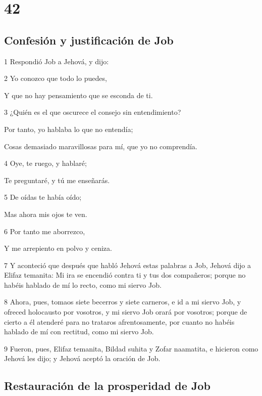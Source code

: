 \chapter{42}

\section*{Confesión y justificación de Job}

\par 1 Respondió Job a Jehová, y dijo:
\par 2 Yo conozco que todo lo puedes,
\par Y que no hay pensamiento que se esconda de ti.
\par 3 ¿Quién es el que oscurece el consejo sin entendimiento?
\par Por tanto, yo hablaba lo que no entendía;
\par Cosas demasiado maravillosas para mí, que yo no comprendía.
\par 4 Oye, te ruego, y hablaré;
\par Te preguntaré, y tú me enseñarás. 
\par 5 De oídas te había oído;
\par Mas ahora mis ojos te ven.
\par 6 Por tanto me aborrezco,
\par Y me arrepiento en polvo y ceniza.
\par 7 Y aconteció que después que habló Jehová estas palabras a Job, Jehová dijo a Elifaz temanita: Mi ira se encendió contra ti y tus dos compañeros; porque no habéis hablado de mí lo recto, como mi siervo Job.
\par 8 Ahora, pues, tomaos siete becerros y siete carneros, e id a mi siervo Job, y ofreced holocausto por vosotros, y mi siervo Job orará por vosotros; porque de cierto a él atenderé para no trataros afrentosamente, por cuanto no habéis hablado de mí con rectitud, como mi siervo Job.
\par 9 Fueron, pues, Elifaz temanita, Bildad suhita y Zofar naamatita, e hicieron como Jehová les dijo; y Jehová aceptó la oración de Job.

\section*{Restauración de la prosperidad de Job}

